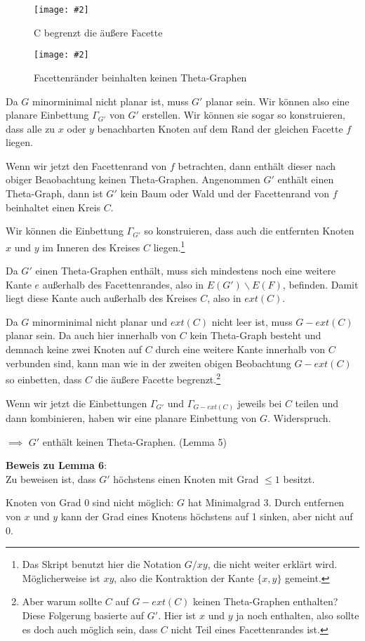 \documentclass[10pt,a4paper]{article}
\makeatletter
\def\maxwidth#1{\ifdim\Gin@nat@width>#1 #1\else\Gin@nat@width\fi}
\newcommand{\imageFigure}[4]{%
    \begin{figure}[h]%
        \centering%
        {%
            \setlength{\fboxsep}{1pt}%
            \setlength{\fboxrule}{1pt}%
            \texttt{[image: \#2]}%
        }%
        \caption{#1}%
        \label{fig:#4}%
    \end{figure}%
}
\makeatother
\begin{document}
\imageFigure{C begrenzt die äußere Facette}{c-outer.png}{.5}{c-outer}
\imageFigure{Facettenränder beinhalten keinen Theta-Graphen}{face-no-theta.png}{.25}{face-no-theta}

Da $G$ minorminimal nicht planar ist, muss $G'$ planar sein.
Wir können also eine planare Einbettung $\Gamma_{G'}$ von $G'$ erstellen.
Wir können sie sogar so konstruieren, dass alle zu $x$ oder $y$ benachbarten
Knoten auf dem Rand der gleichen Facette $f$ liegen.

Wenn wir jetzt den Facettenrand von $f$ betrachten, dann enthält dieser
nach obiger Beaobachtung keinen Theta-Graphen.
Angenommen $G'$ enthält einen Theta-Graph, dann ist $G'$ kein Baum oder Wald
und der Facettenrand von $f$ beinhaltet einen Kreis $C$.

Wir können die Einbettung $\Gamma_{G'}$ so konstruieren, dass auch die
entfernten Knoten $x$ und $y$ im Inneren des Kreises $C$ liegen.\footnote{Das
Skript benutzt hier die Notation $G/xy$, die nicht weiter erklärt wird.
Möglicherweise ist $xy$, also die Kontraktion der Kante $\{x, y\}$ gemeint.}

Da $G'$ einen Theta-Graphen enthält, muss sich mindestens noch eine weitere
Kante $e$ außerhalb des Facettenrandes, also in $E(G') \backslash E(F)$,
befinden.
Damit liegt diese Kante auch außerhalb des Kreises $C$, also in $ext(C)$.

Da $G$ minorminimal nicht planar und $ext(C)$ nicht leer ist, muss $G-ext(C)$
planar sein.
Da auch hier innerhalb von $C$ kein Theta-Graph besteht und demnach keine zwei
Knoten auf $C$ durch eine weitere Kante innerhalb von $C$ verbunden sind, kann
man wie in der zweiten obigen Beobachtung $G-ext(C)$ so einbetten, dass $C$
die äußere Facette begrenzt.\footnote{Aber warum sollte $C$ auf $G-ext(C)$
keinen Theta-Graphen enthalten? Diese Folgerung basierte auf $G'$. Hier ist $x$
und $y$ ja noch enthalten, also sollte es doch auch möglich sein, dass $C$
nicht Teil eines Facettenrandes ist.}

Wenn wir jetzt die Einbettungen $\Gamma_{G'}$ und $\Gamma_{G-ext(C)}$ jeweils
bei $C$ teilen und dann kombinieren, haben wir eine planare Einbettung von $G$.
Widerspruch.

$\implies$ $G'$ enthält keinen Theta-Graphen. (Lemma 5)

\textbf{Beweis zu Lemma 6}:\\
Zu beweisen ist, dass $G'$ höchstens einen Knoten mit Grad $\leq 1$ besitzt.

Knoten von Grad 0 sind nicht möglich:
$G$ hat Minimalgrad 3.
Durch entfernen von $x$ und $y$ kann der Grad eines Knotens höchstens auf 1
sinken, aber nicht auf 0.
\end{document}

